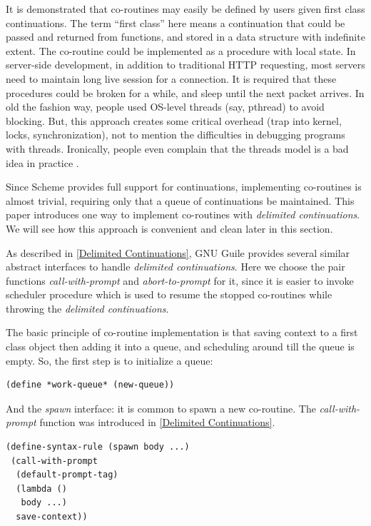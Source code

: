 \documentclass[numbers,numberedpars]{sigplanconf}
\begin{document}
It is demonstrated that co-routines may easily be defined by users given first class continuations\citep{Haynes:1984:CC:800055.802046}. The
term ``first class'' here means a continuation that could be passed and returned from functions, and stored in a data structure with indefinite
extent. The co-routine could be implemented as a procedure with local state. In server-side development, in addition to traditional HTTP requesting, most servers need to maintain long live session for a connection. It is required that these procedures could be broken for a while, and sleep until the next packet arrives. In old the fashion way, people used OS-level threads (say, pthread) to avoid blocking. But, this approach creates some critical overhead (trap into kernel, locks, synchronization), not to mention the difficulties in debugging programs with threads. Ironically, people even complain that the threads model is a bad idea in practice \citep{ousterhout1996threads}.

Since Scheme provides full support for continuations, implementing co-routines is almost trivial, requiring only that a queue of continuations be maintained. This paper introduces one way to implement co-routines with {\it delimited continuations}. We will see how this approach is convenient and clean later in this section.

As described in \ref{Delimited Continuations}, GNU Guile provides several similar abstract interfaces to handle {\it delimited continuations}. Here we choose the pair functions {\it call-with-prompt} and {\it abort-to-prompt} for it, since it is easier to invoke scheduler procedure which is used to resume the stopped co-routines while throwing the {\it delimited continuations}.

The basic principle of co-routine implementation is that saving context to a first class object then adding it into a queue, and scheduling around till the queue is empty. So, the first step is to initialize a queue:

\begin{lstlisting}
(define *work-queue* (new-queue))
\end{lstlisting}

And the {\it spawn} interface: it is common to spawn a new co-routine. The {\it call-with-prompt} function was introduced in \ref{Delimited Continuations}.

\begin{lstlisting}
(define-syntax-rule (spawn body ...)
 (call-with-prompt
  (default-prompt-tag)
  (lambda ()
   body ...)
  save-context))
\end{lstlisting}
\end{document}
